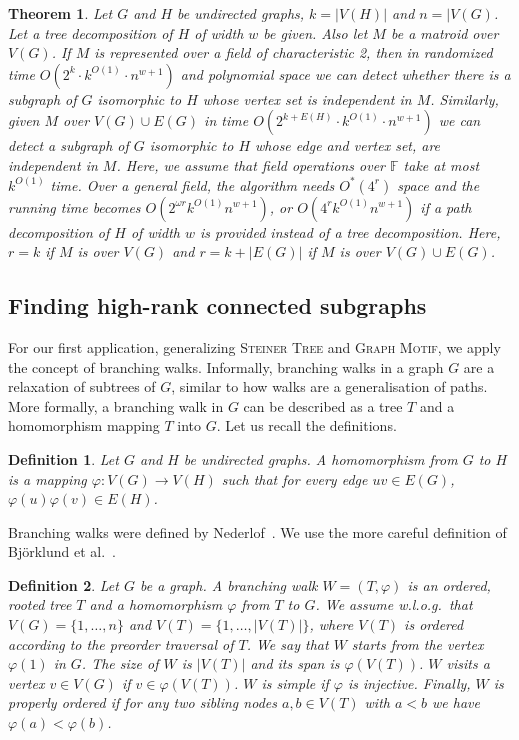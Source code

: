 \documentclass[10pt,a4paper]{article}
\newtheorem{theorem}{Theorem}[section]
\newtheorem{definition}{Definition}[section]
\newcommand{\F}{\ensuremath{\mathbb F}\xspace}
\begin{document}
\begin{theorem}
  \label{thm:subgraph-hom}
  Let $G$ and $H$ be undirected graphs, $k=|V(H)|$ and $n=|V(G)$.
  Let a tree decomposition of $H$ of width $w$ be given. Also let $M$
  be a matroid over $V(G)$. If $M$ is represented over a field of
  characteristic 2, then in randomized time $O(2^k \cdot k^{O(1)} \cdot n^{w+1})$
  and polynomial space we can detect whether there is a subgraph of $G$ 
  isomorphic to $H$ whose vertex set is independent in $M$.
  Similarly, given $M$ over 
  $V(G) \cup E(G)$ in time
  $O(2^{k+E(H)} \cdot k ^{O(1)} \cdot n^{w+1})$
  we can detect a subgraph of $G$ isomorphic to $H$ whose
  edge and vertex set, are independent in $M$.
  Here, we assume that field operations over $\F$ take at most $k^{O(1)}$ time.
  Over a general field, the algorithm needs $O^*(4^r)$ space and 
  the running time becomes $O(2^{\omega r} k^{O(1)} n^{w+1})$,
  or $O(4^r k^{O(1)} n^{w+1})$ if a path decomposition of $H$ of width $w$ is provided
  instead of a tree decomposition. Here, $r=k$ if $M$ is over $V(G)$
  and $r=k+|E(G)|$ if $M$ is over $V(G) \cup E(G)$.
\end{theorem}

\subsection{Finding high-rank connected subgraphs}

For our first application, generalizing \textsc{Steiner Tree} and
\textsc{Graph Motif}, we apply the concept of branching walks.
Informally, branching walks in a graph $G$ are a relaxation of
subtrees of $G$, similar to how walks are a generalisation of paths.
More formally, a branching walk in $G$ can be described as a tree
$T$ and a homomorphism mapping $T$ into $G$. Let us recall the
definitions. 

\begin{definition}
  Let $G$ and $H$ be undirected graphs. A \emph{homomorphism} from $G$
  to $H$ is a mapping $\varphi \colon V(G) \to V(H)$ such that
  for every edge $uv \in E(G)$, $\varphi(u)\varphi(v) \in E(H)$. 
\end{definition}

Branching walks were defined by Nederlof~\cite{Nederlof13algorithmica}.
We use the more careful definition of Björklund et al.~\cite{BjorklundKK16}.

\begin{definition}
  Let $G$ be a graph. A \emph{branching walk} $W=(T,\varphi)$
  is an ordered, rooted tree $T$ and a homomorphism
  $\varphi$ from $T$ to $G$.
  We assume w.l.o.g.\ that $V(G)=\{1,\ldots,n\}$ and $V(T)=\{1,\ldots,|V(T)|\}$,
  where $V(T)$ is ordered according to the preorder traversal of $T$.
  We say that $W$ \emph{starts from} the vertex $\varphi(1)$ in $G$.
  The \emph{size} of $W$ is $|V(T)|$ and its \emph{span} is $\varphi(V(T))$.   
  $W$ \emph{visits} a vertex $v \in V(G)$ if $v \in \varphi(V(T))$.
  $W$ is \emph{simple} if $\varphi$ is injective. 
  Finally, $W$ is \emph{properly ordered}
  if for any two sibling nodes $a, b \in V(T)$ with $a<b$
  we have $\varphi(a)<\varphi(b)$. 
\end{definition}
\end{document}
